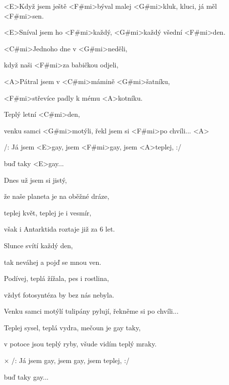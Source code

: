 

\zs
<E>Když jsem ještě <F#mi>býval malej <G#mi>kluk,
kluci, já měl <F#mi>sen.

<E>Sníval jsem ho <F#mi>každý, <G#mi>každý všední 
<F#mi>den.

<C#mi>Jednoho dne v <G#mi>neděli,

když naši <F#mi>za babičkou odjeli,

<A>Pátral jsem v <C#mi>mámině <G#mi>šatníku,

<F#mi>střevíce padly k mému <A>kotníku.

Teplý letní <C#mi>den,

venku samci <G#mi>motýli, řekl jsem si <F#mi>po chvíli... <A>
\ks

\zr
/: Já jsem <E>gay, jsem <F#mi>gay, jsem <A>teplej, :/

buď taky <E>gay...
\kr

\zs
Dnes už jsem si jistý,

že naše planeta je na oběžné dráze,

teplej květ, teplej je i vesmír,

však i Antarktida roztaje již za 6 let.

Slunce svítí každý den,

tak neváhej a pojď se mnou ven.

Podívej, teplá žížala, pes i rostlina,

vždyť fotosyntéza by bez nás nebyla.

Venku samci motýlí tulipány pylují, řekněme si po chvíli...
\ks

\zr \kr

\zs
Teplej sysel, teplá vydra, mečoun je gay taky,

v potoce jsou teplý ryby, všude vidím teplý mraky.
\ks

× /: Já jsem gay, jsem gay, jsem teplej, :/

buď taky gay...
\kr

\kp
